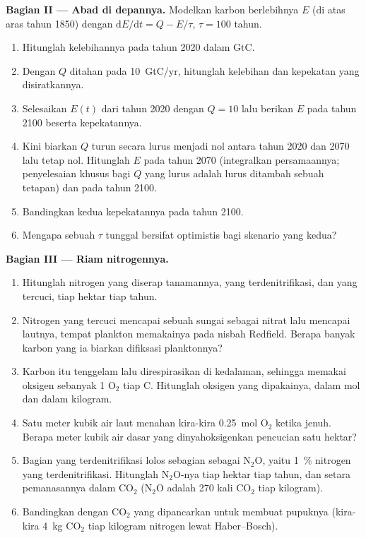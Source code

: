 \begin{problem}
\medskip
\noindent\textbf{Bagian II --- Abad di depannya.}
Modelkan karbon berlebihnya $E$ (di atas aras tahun 1850) dengan
$\mathrm{d}E/\mathrm{d}t = Q - E/\tau$, $\tau = 100$ tahun.
\begin{enumerate}[resume]
  \item Hitunglah kelebihannya pada tahun 2020 dalam GtC.
  \item Dengan $Q$ ditahan pada \qty{10}{GtC/yr}, hitunglah kelebihan
         dan kepekatan yang disiratkannya.
  \item Selesaikan $E(t)$ dari tahun 2020 dengan $Q = 10$ lalu berikan
        $E$ pada tahun 2100 beserta kepekatannya.
  \item Kini biarkan $Q$ turun secara lurus menjadi nol antara tahun
        2020 dan 2070 lalu tetap nol. Hitunglah $E$ pada tahun 2070
        (integralkan persamaannya; penyelesaian khusus bagi $Q$ yang
        lurus adalah lurus ditambah sebuah tetapan) dan pada tahun 2100.
  \item Bandingkan kedua kepekatannya pada tahun 2100.
  \item Mengapa sebuah $\tau$ tunggal bersifat optimistis bagi skenario
        yang kedua?
\end{enumerate}

\medskip
\noindent\textbf{Bagian III --- Riam nitrogennya.}
\begin{enumerate}[resume]
  \item Hitunglah nitrogen yang diserap tanamannya, yang
        terdenitrifikasi, dan yang tercuci, tiap hektar tiap tahun.
  \item Nitrogen yang tercuci mencapai sebuah sungai sebagai nitrat
        lalu mencapai lautnya, tempat plankton memakainya pada nisbah
        Redfield. Berapa banyak karbon yang ia biarkan difiksasi
        planktonnya?
  \item Karbon itu tenggelam lalu direspirasikan di kedalaman, sehingga
        memakai oksigen sebanyak 1 $\mathrm{O_2}$ tiap C. Hitunglah
        oksigen yang dipakainya, dalam mol dan dalam kilogram.
  \item Satu meter kubik air laut menahan kira-kira \qty{0.25}{mol}
        $\mathrm{O_2}$ ketika jenuh. Berapa meter kubik air dasar yang
        dinyahoksigenkan pencucian satu hektar?
  \item Bagian yang terdenitrifikasi lolos sebagian sebagai
        $\mathrm{N_2O}$, yaitu \qty{1}{\%} nitrogen yang
        terdenitrifikasi. Hitunglah $\mathrm{N_2O}$-nya tiap hektar
        tiap tahun, dan setara pemanasannya dalam $\mathrm{CO_2}$
        ($\mathrm{N_2O}$ adalah 270 kali $\mathrm{CO_2}$ tiap kilogram).
  \item Bandingkan dengan $\mathrm{CO_2}$ yang dipancarkan untuk
        membuat pupuknya (kira-kira \qty{4}{kg} $\mathrm{CO_2}$ tiap
        kilogram nitrogen lewat Haber--Bosch).
\end{enumerate}


\end{problem}
